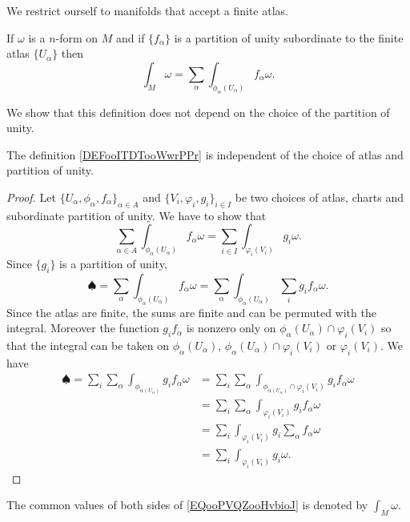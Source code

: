 We restrict ourself to manifolds that accept a finite atlas.

\begin{definition}       \label{DEFooITDTooWwrPPr}
    If \( \omega\) is a \( n\)-form on \( M\) and if \( \{ f_{\alpha} \} \) is a partition of unity subordinate to the finite atlas \( \{ U_{\alpha} \}\) then
    \begin{equation}
        \int_M\omega=\sum_{\alpha}\int_{\phi_{\alpha}(U_{\alpha})}f_{\alpha}\omega.
    \end{equation}
\end{definition}

We show that this definition does not depend on the choice of the partition of unity.
\begin{lemma} \label{LEMooCMIZooHhHaHV}
    The definition \ref{DEFooITDTooWwrPPr} is independent of the choice of atlas and partition of unity.
\end{lemma}

\begin{proof}
    Let \(  \{ U_{\alpha},\phi_{\alpha},f_{\alpha} \}_{\alpha\in A}  \) and \( \{ V_i,\varphi_i,g_i \}_{i\in I}\) be two choices of atlas, charts and subordinate partition of unity. We have to show that
    \begin{equation}        \label{EQooPVQZooHvbioJ}
        \sum_{\alpha\in A}\int_{\phi_{\alpha}(U_{\alpha})}f_{\alpha}\omega=\sum_{i\in I}\int_{\varphi_i(V_i)}g_i\omega.
    \end{equation}
    Since \( \{ g_i \}\) is a partition of unity,
    \begin{equation}
            \spadesuit=\sum_{\alpha}\int_{\phi_{\alpha}(U_{\alpha})}f_{\alpha}\omega=\sum_{\alpha}\int_{\phi_{\alpha}(U_{\alpha})}\sum_ig_if_{\alpha}\omega.
    \end{equation}
    Since the atlas are finite, the sums are finite and can be permuted with the integral. Moreover the function \( g_if_{\alpha}\) is nonzero only on \( \phi_{\alpha}(U_{\alpha})\cap\varphi_i(V_i)\) so that the integral can be taken on \( \phi_{\alpha}(U_{\alpha})\), \( \phi_{\alpha}(U_{\alpha})\cap\varphi_i(V_i)\) or \( \varphi_i(V_i)\). We have
    \begin{subequations}
        \begin{align}
            \spadesuit=\sum_i\sum_{\alpha}\int_{\phi_{\alpha(U_{\alpha})}}g_if_{\alpha}\omega&=  \sum_i\sum_{\alpha}\int_{\phi_{\alpha(U_{\alpha})}\cap \varphi_i(V_i)}g_if_{\alpha}\omega\\
            &=  \sum_i\sum_{\alpha}\int_{\varphi_i(V_i)}g_if_{\alpha}\omega\\
            &= \sum_i\int_{\varphi_i(V_i)}g_i\sum_{\alpha}f_{\alpha}\omega\\
            &=\sum_i\int_{\varphi_i(V_i)}g_i\omega.
        \end{align}
    \end{subequations}
\end{proof}
The common values of both sides of \eqref{EQooPVQZooHvbioJ} is denoted by \( \int_M\omega\).

